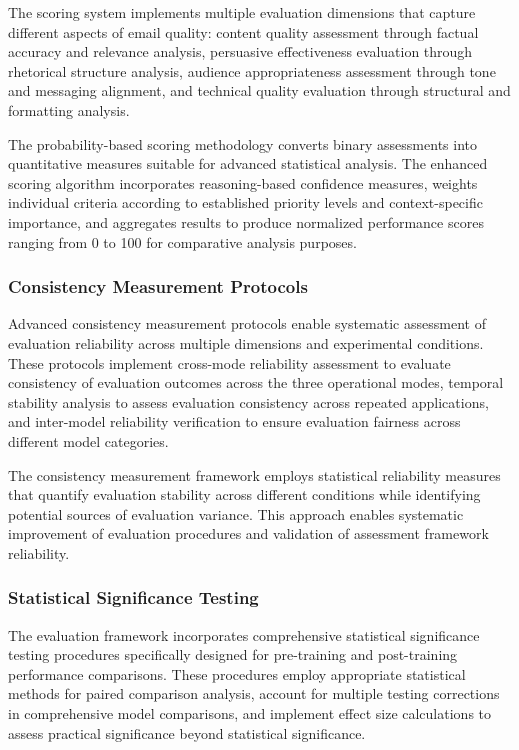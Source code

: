 The scoring system implements multiple evaluation dimensions that capture different aspects of email quality: content quality assessment through factual accuracy and relevance analysis, persuasive effectiveness evaluation through rhetorical structure analysis, audience appropriateness assessment through tone and messaging alignment, and technical quality evaluation through structural and formatting analysis.

The probability-based scoring methodology converts binary assessments into quantitative measures suitable for advanced statistical analysis. The enhanced scoring algorithm incorporates reasoning-based confidence measures, weights individual criteria according to established priority levels and context-specific importance, and aggregates results to produce normalized performance scores ranging from 0 to 100 for comparative analysis purposes.

\subsubsection{Consistency Measurement Protocols}

Advanced consistency measurement protocols enable systematic assessment of evaluation reliability across multiple dimensions and experimental conditions. These protocols implement cross-mode reliability assessment to evaluate consistency of evaluation outcomes across the three operational modes, temporal stability analysis to assess evaluation consistency across repeated applications, and inter-model reliability verification to ensure evaluation fairness across different model categories.

The consistency measurement framework employs statistical reliability measures that quantify evaluation stability across different conditions while identifying potential sources of evaluation variance. This approach enables systematic improvement of evaluation procedures and validation of assessment framework reliability.

\subsubsection{Statistical Significance Testing}

The evaluation framework incorporates comprehensive statistical significance testing procedures specifically designed for pre-training and post-training performance comparisons. These procedures employ appropriate statistical methods for paired comparison analysis, account for multiple testing corrections in comprehensive model comparisons, and implement effect size calculations to assess practical significance beyond statistical significance.

